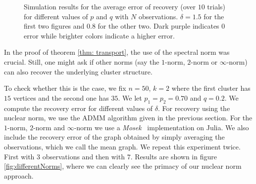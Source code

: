 \documentclass[12pt]{amsart}
\theoremstyle{remark}
\begin{document}
\begin{figure}[H]
\begin{tabular}{cc}
\end{tabular}
\caption{Simulation results for the average error of recovery (over $10$ trials) for different values of $p$ and $q$ with $N$ observations. $\delta = 1.5$ for the first two figures and $0.8$ for the other two. Dark purple indicates 0 error while brighter colors indicate a higher error.}
        \label{fig:Variapq}
\end{figure}

In the proof of theorem \ref{thm: transport}, the use of the spectral norm was crucial. Still, one might ask if other norms (say the $1$-norm, $2$-norm or $\infty$-norm) can also recover the underlying cluster structure.

To check whether this is the case, we fix $n=50$, $k=2$ where the first cluster has $15$ vertices and the second one has $35$. We let $p_1 = p_2 = 0.70$ and $q=0.2$. We compute the recovery error for different values of $\delta$. For recovery using the nuclear norm, we use the ADMM algorithm given in the previous section. For the $1$-norm, $2$-norm and $\infty$-norm we use a \textit{Mosek}~\cite{Mosek} implementation on Julia. 
We also include the recovery error of the graph obtained by simply averaging the observations, which we call the mean graph.
We repeat this experiment twice. First with $3$ observations and then with $7$.
Results are shown in figure \ref{fig:differentNorms}, where we can clearly see the primacy of our nuclear norm approach.
\end{document}
